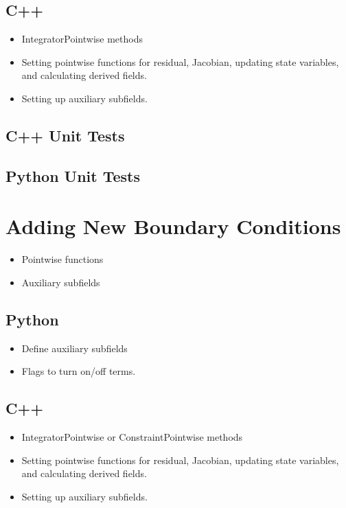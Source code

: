 \subsection{C++}

\begin{itemize}
\item IntegratorPointwise methods
\item Setting pointwise functions for residual, Jacobian, updating
  state variables, and calculating derived fields.
\item Setting up auxiliary subfields.
\end{itemize}
  
\subsection{C++ Unit Tests}

\subsection{Python Unit Tests}

\section{Adding New Boundary Conditions}


\begin{itemize}
\item Pointwise functions
\item Auxiliary subfields
\end{itemize}

\subsection{Python}

\begin{itemize}
\item Define auxiliary subfields
\item Flags to turn on/off terms.
\end{itemize}

\subsection{C++}

\begin{itemize}
\item IntegratorPointwise or ConstraintPointwise methods
\item Setting pointwise functions for residual, Jacobian, updating
  state variables, and calculating derived fields.
\item Setting up auxiliary subfields.
\end{itemize}

